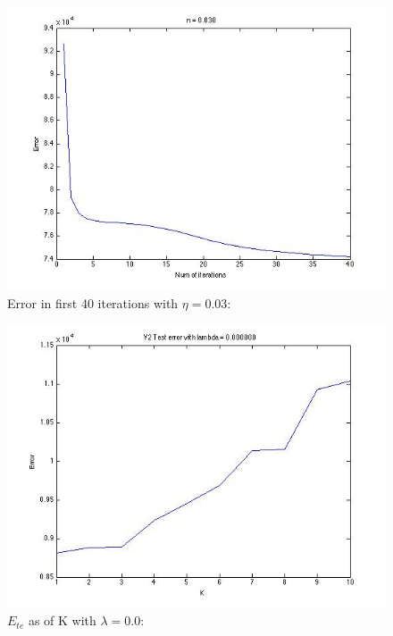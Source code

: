 \documentclass{article}
\begin{document}
\begin{figure}[H]
\centering
\includegraphics[scale=0.5]{EAsOfK-V2.jpg}
\caption{ Error in first 40 iterations with $\eta=0.03$: }
\label{}
\end{figure}

\begin{figure}[H]
\centering
\includegraphics[scale=0.5]{TestErrorLambda0-V2.jpg}
\caption{ $E_{te}$ as of K with $\lambda=0.0$:}
\label{}
\end{figure}
\end{document}
